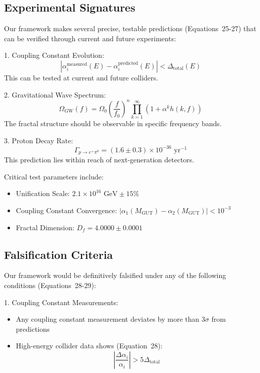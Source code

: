 \documentclass[12pt]{article}
\begin{document}
\subsection{Experimental Signatures}

Our framework makes several precise, testable predictions (Equations~25-27) that can be verified through current and future experiments:

1. Coupling Constant Evolution:
   \begin{equation}
   |\alpha_i^{\text{measured}}(E) - \alpha_i^{\text{predicted}}(E)| < \Delta_{\text{total}}(E)
   \end{equation}
   This can be tested at current and future colliders.

2. Gravitational Wave Spectrum:
   \begin{equation}
   \Omega_{\text{GW}}(f) = \Omega_0\left(\frac{f}{f_0}\right)^n \prod_{k=1}^{\infty} \left(1 + \alpha^k h(k,f)\right)
   \end{equation}
   The fractal structure should be observable in specific frequency bands.

3. Proton Decay Rate:
   \begin{equation}
   \Gamma_{p\to e^+\pi^0} = (1.6 \pm 0.3) \times 10^{-36} \text{ yr}^{-1}
   \end{equation}
   This prediction lies within reach of next-generation detectors.

Critical test parameters include:

\begin{itemize}
\item Unification Scale: $2.1 \times 10^{16} \text{ GeV} \pm 15\%$
\item Coupling Constant Convergence: $|\alpha_1(M_{\text{GUT}}) - \alpha_2(M_{\text{GUT}})| < 10^{-3}$
\item Fractal Dimension: $D_f = 4.0000 \pm 0.0001$
\end{itemize}

\subsection{Falsification Criteria}

Our framework would be definitively falsified under any of the following conditions (Equations~28-29):

1. Coupling Constant Measurements:
   \begin{itemize}
   \item Any coupling constant measurement deviates by more than $3\sigma$ from predictions
   \item High-energy collider data shows (Equation~28):
     \begin{equation}
     \left|\frac{\Delta\alpha_i}{\alpha_i}\right| > 5\Delta_{\text{total}}
     \end{equation}
   \end{itemize}
\end{document}
